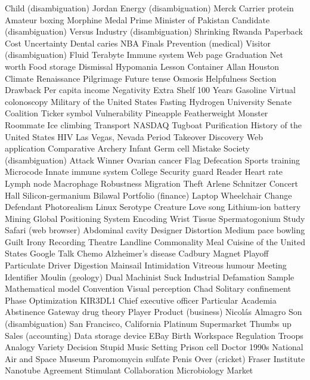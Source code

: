 Child (disambiguation)  Jordan  Energy (disambiguation)  
Merck  Carrier protein  Amateur boxing  
Morphine  Medal  Prime Minister of Pakistan  
Candidate (disambiguation)  Versus  Industry (disambiguation)  
Shrinking  Rwanda  Paperback  
Cost  Uncertainty  Dental caries  
NBA Finals  Prevention (medical)  Visitor (disambiguation)  
Fluid  Terabyte  Immune system  
Web page  Graduation  Net worth  
Food storage  Dismissal  Hypomania  
Lesson  Container  Allan Houston  
Climate  Renaissance  Pilgrimage  
Future tense  Osmosis  Helpfulness  
Section  Drawback  Per capita income  
Negativity  Extra  Shelf  
100 Years  Gasoline  Virtual colonoscopy  
Military of the United States  Fasting  Hydrogen  
University  Senate  Coalition  
Ticker symbol  Vulnerability  Pineapple  
Featherweight  Monster  Roommate  
Ice climbing  Transport  NASDAQ  
Tugboat  Purification  History of the United States  
HIV  Las Vegas, Nevada  Period  
Takeover  Discovery  Web application  
Comparative  Archery  Infant  
Germ cell  Mistake  Society (disambiguation)  
Attack  Winner  Ovarian cancer  
Flag  Defecation  Sports training  
Microcode  Innate immune system  College  
Security guard  Reader  Heart rate  
Lymph node  Macrophage  Robustness  
Migration  Theft  Arlene Schnitzer Concert Hall  
Silicon-germanium  Bilawal  Portfolio (finance)  
Laptop  Wheelchair  Change  
Defendant  Photorealism  Linux  
Serotype  Creature  Love song  
Lithium-ion battery  Mining  Global Positioning System  
Encoding  Wrist  Tissue  
Spermatogonium  Study  Safari (web browser)  
Abdominal cavity  Designer  Distortion  
Medium pace bowling  Guilt  Irony  
Recording  Theatre  Landline  
Commonality  Meal  Cuisine of the United States  
Google Talk  Chemo  Alzheimer's disease  
Cadbury  Magnet  Playoff  
Particulate  Driver  Digestion  
Mainsail  Intimidation  Vitreous humour  
Meeting  Identifier  Moulin (geology)  
Dual  Machinist  Suck  
Industrial  Defamation  Sample  
Mathematical model  Convention  Visual perception  
Chad  Solitary confinement  Phase  
Optimization  KIR3DL1  Chief executive officer  
Particular  Academia  Abstinence  
Gateway drug theory  Player  Product (business)  
Nicolás Almagro  Son (disambiguation)  San Francisco, California  
Platinum  Supermarket  Thumbs up  
Sales (accounting)  Data storage device  EBay  
Birth  Workspace  Regulation  
Troops  Analogy  Variety  
Decision  Stupid  Music  
Setting  Prison cell  Doctor  
1990s  National Air and Space Museum  Paromomycin sulfate  
Penis  Over (cricket)  Fraser Institute  
Nanotube  Agreement  Stimulant  
Collaboration  Microbiology  Market  
